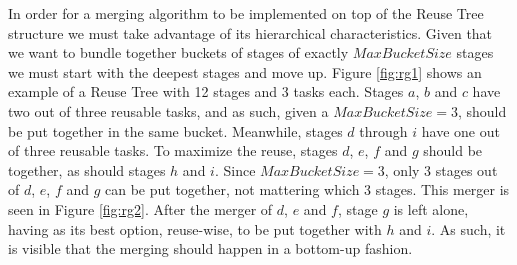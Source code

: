 In order for a merging algorithm to be implemented on top of the Reuse Tree structure we must take advantage of its hierarchical characteristics. Given that we want to bundle together buckets of stages of exactly $MaxBucketSize$ stages we must start with the deepest stages and move up. Figure \ref{fig:rg1} shows an example of a Reuse Tree with 12 stages and 3 tasks each. Stages $a$, $b$ and $c$ have two out of three reusable tasks, and as such, given a $MaxBucketSize=3$, should be put together in the same bucket. Meanwhile, stages $d$ through $i$ have one out of three reusable tasks. To maximize the reuse, stages $d$, $e$, $f$ and $g$ should be together, as should stages $h$ and $i$. Since $MaxBucketSize=3$, only 3 stages out of $d$, $e$, $f$ and $g$ can be put together, not mattering which 3 stages. This merger is seen in Figure \ref{fig:rg2}. After the merger of $d$, $e$ and $f$, stage $g$ is left alone, having as its best option, reuse-wise, to be put together with $h$ and $i$. As such, it is visible that the merging should happen in a bottom-up fashion.

